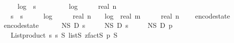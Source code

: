 \begin{isabellebody}
\ \ \ \ {}\ {\isacharasterisk}{\kern0pt}\ log\ {}\ {\isacharparenleft}{\kern0pt}s\ {\isacharplus}{\kern0pt}\ {}{\isacharparenright}{\kern0pt}\ {\isacharplus}{\kern0pt}\isanewline
\ \ \ \ {}\ {\isacharasterisk}{\kern0pt}\ log\ {}\ {\isacharparenleft}{\kern0pt}{}\ {\isacharplus}{\kern0pt}\ {}\ {\isacharasterisk}{\kern0pt}\ real\ n{\isacharparenright}{\kern0pt}\ {\isacharplus}{\kern0pt}\isanewline
\ \ \ \ s\ {\isacharasterisk}{\kern0pt}\ s\ {\isacharasterisk}{\kern0pt}\ {\isacharparenleft}{\kern0pt}{}{}\ {\isacharplus}{\kern0pt}\ {}\ {\isacharasterisk}{\kern0pt}\ log\ {}\ {\isacharparenleft}{\kern0pt}{}\ {\isacharplus}{\kern0pt}\ {}\ {\isacharasterisk}{\kern0pt}\ real\ n{\isacharparenright}{\kern0pt}\ {\isacharplus}{\kern0pt}\ {}\ {\isacharasterisk}{\kern0pt}\ log\ {}\ {\isacharparenleft}{\kern0pt}real\ m\ {\isacharasterisk}{\kern0pt}\ {\isacharparenleft}{\kern0pt}{}\ {\isacharplus}{\kern0pt}\ {}\ {\isacharasterisk}{\kern0pt}\ real\ n{\isacharparenright}{\kern0pt}\ {\isacharplus}{\kern0pt}\ {}\ {\isacharparenright}{\kern0pt}{\isacharparenright}{\kern0pt}{\isacharparenright}{\kern0pt}{\isachardoublequoteclose}\isanewline
\isanewline
{}\isamarkupfalse%
\ encode{\isacharunderscore}{\kern0pt}state\ \isanewline
\ \ {\isachardoublequoteopen}encode{\isacharunderscore}{\kern0pt}state\ {\isacharequal}{\kern0pt}\ \isanewline
\ \ \ \ N\isactrlsub S\ {\isasymtimes}\isactrlsub D\ {\isacharparenleft}{\kern0pt}{\isasymlambda}s\ \isanewline
\ \ \ \ N\isactrlsub S\ {\isasymtimes}\isactrlsub D\ {\isacharparenleft}{\kern0pt}{\isasymlambda}s\ \isanewline
\ \ \ \ N\isactrlsub S\ {\isasymtimes}\isactrlsub D\ {\isacharparenleft}{\kern0pt}{\isasymlambda}p{\isachardot}{\kern0pt}\ \isanewline
\ \ \ \ {\isacharparenleft}{\kern0pt}List{\isachardot}{\kern0pt}product\ {\isacharbrackleft}{\kern0pt}{}{\isachardot}{\kern0pt}{\isachardot}{\kern0pt}{\isacharless}{\kern0pt}s\ {\isacharbrackleft}{\kern0pt}{}{\isachardot}{\kern0pt}{\isachardot}{\kern0pt}{\isacharless}{\kern0pt}s\ {\isasymrightarrow}\isactrlsub S\ {\isacharparenleft}{\kern0pt}list\isactrlsub S\ {\isacharparenleft}{\kern0pt}zfact\isactrlsub S\ p{\isacharparenright}{\kern0pt}{\isacharparenright}{\kern0pt}{\isacharparenright}{\kern0pt}\ {\isasymtimes}\isactrlsub S\isanewline

\end{isabellebody}
